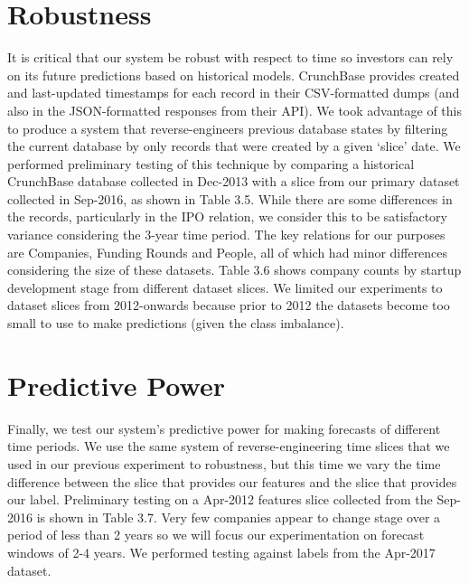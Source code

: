 \documentclass[../thesis/thesis.tex]{subfiles}
\begin{document}
\section{Robustness}

It is critical that our system be robust with respect to time so investors can rely on its future predictions based on historical models. CrunchBase provides created and last-updated timestamps for each record in their CSV-formatted dumps (and also in the JSON-formatted responses from their API). We took advantage of this to produce a system that  reverse-engineers previous database states by filtering the current database by only records that were created by a given ‘slice’ date. We performed preliminary testing of this technique by comparing a historical CrunchBase database collected in Dec-2013 with a slice from our primary dataset collected in Sep-2016, as shown in Table 3.5. While there are some differences in the records, particularly in the IPO relation, we consider this to be satisfactory variance considering the 3-year time period. The key relations for our purposes are Companies, Funding Rounds and People, all of which had minor differences considering the size of these datasets. Table 3.6 shows company counts by startup development stage from different dataset slices. We limited our experiments to dataset slices from 2012-onwards because prior to 2012 the datasets become too small to use to make predictions (given the class imbalance).

\section{Predictive Power}

Finally, we test our system’s predictive power for making forecasts of different time periods. We use the same system of reverse-engineering time slices that we used in our previous experiment to robustness, but this time we vary the time difference between the slice that provides our features and the slice that provides our label. Preliminary testing on a Apr-2012 features slice collected from the Sep-2016 is shown in Table 3.7. Very few companies appear to change stage over a period of less than 2 years so we will focus our experimentation on forecast windows of 2-4 years. We performed testing against labels from the Apr-2017 dataset.

\end{document}
